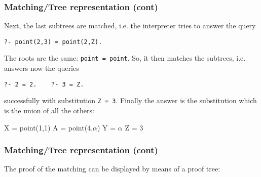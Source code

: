 %
\begin{frame}[containsverbatim]
\frametitle{Matching/Tree representation (cont)}

Next, the last subtrees are matched, i.e. the interpreter tries to
answer the query 
{\small
\begin{verbatim}
?- point(2,3) = point(2,Z).
\end{verbatim}
}
The roots are the same: \texttt{point = point}. So, it then matches the
subtrees, i.e. answers now the queries
{\small
\begin{verbatim}
?- 2 = 2.    ?- 3 = Z.
\end{verbatim}
}
successfully with substitution \texttt{Z = 3}. Finally the answer is
the substitution which is the union of all the others:
{\small
\begin{semiverbatim}
X = point(1,1)
A = point(4,\(\alpha\))
Y = \(\alpha\)
Z = 3
\end{semiverbatim}
}

\end{frame}

%
\begin{frame}[containsverbatim]
\frametitle{Matching/Tree representation (cont)}

The proof of the matching can be displayed by means of a proof tree:

\end{frame}

